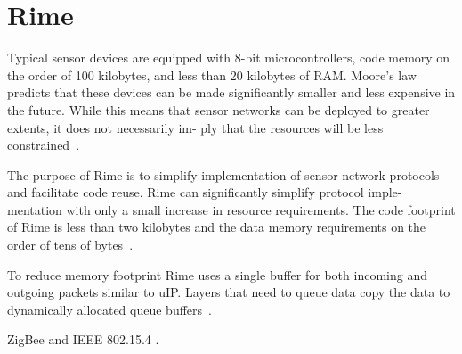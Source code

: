 \section{Rime}\label{sec:contiki-rime}
Typical sensor devices are equipped with 8-bit microcontrollers,
code memory on the order of 100 kilobytes, and less than
20 kilobytes of RAM. Moore's law predicts that these devices
can be made significantly smaller and less expensive
in the future. While this means that sensor networks can
be deployed to greater extents, it does not necessarily im-
ply that the resources will be less constrained~\cite{paper-contiki}.

The purpose of Rime is to simplify implementation of
sensor network protocols and facilitate code reuse. 
Rime can significantly simplify protocol imple-
mentation with only a small increase in resource requirements.
The code footprint of Rime is less than two kilobytes and the
data memory requirements on the order of tens of bytes~\cite{paper-rime}.

To reduce memory footprint Rime uses a single buffer for
both incoming and outgoing packets similar to uIP. Layers
that need to queue data copy the data to dynamically
allocated queue buffers~\cite{paper-rime}.

ZigBee and IEEE 802.15.4 \cite{ieee-802.15.4}.
